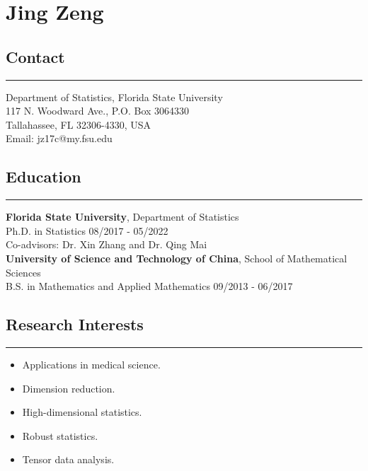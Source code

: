 \documentclass[10pt, oneside]{article}
\title{\vspace{-5em}}
\date{}
\begin{document}
\maketitle

\section*{Jing Zeng}
\vspace{10pt}

\subsection*{Contact}
\noindent\rule{\textwidth}{1pt}
Department of Statistics, Florida State University\\
117 N. Woodward Ave., P.O. Box 3064330\\
Tallahassee, FL 32306-4330, USA\\
Email: jz17c@my.fsu.edu

\subsection*{Education}
\noindent\rule{\textwidth}{1pt}
\textbf{Florida State University}, Department of Statistics\\
Ph.D. in Statistics \hfill 08/2017 - 05/2022\\
Co-advisors: Dr. Xin Zhang and Dr. Qing Mai\\[-2mm]

\textbf{University of Science and Technology of China}, School of Mathematical Sciences\\
B.S. in Mathematics and Applied Mathematics \hfill 09/2013 - 06/2017\\

\subsection*{Research Interests}
\noindent\rule{\textwidth}{1pt}
\vspace{-6mm}
\begin{itemize}[itemsep=-1pt]
    \item Applications in medical science.
    \item Dimension reduction.
    \item High-dimensional statistics.
    \item Robust statistics.
    \item Tensor data analysis.
\end{itemize}
\end{document}
